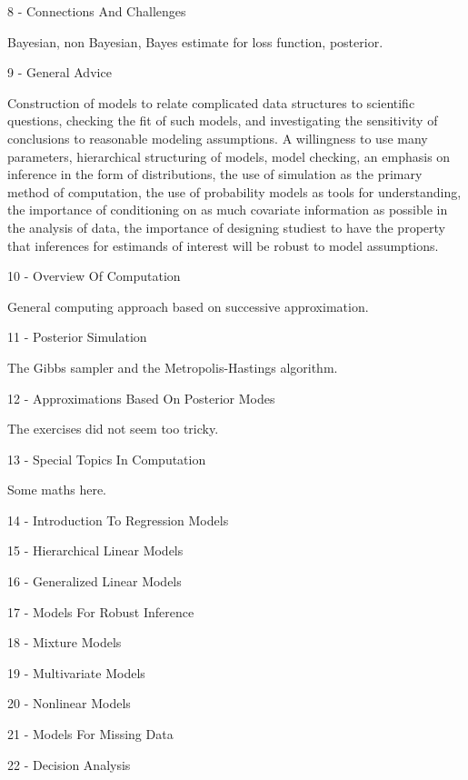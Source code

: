 8 - Connections And Challenges

Bayesian, non Bayesian, Bayes estimate for loss function, posterior.

9 - General Advice

Construction of models to relate complicated data structures to scientific questions, checking the fit of such models, and investigating the sensitivity of conclusions to reasonable modeling assumptions. A willingness to use many parameters, hierarchical structuring of models, model checking, an emphasis on inference in the form of distributions, the use of simulation as the primary method of computation, the use of probability models as tools for understanding, the importance of conditioning on as much covariate information as possible in the analysis of data, the importance of designing studiest to have the property that inferences for estimands of interest will be robust to model assumptions.

10 - Overview Of Computation

General computing approach based on successive approximation.

11 - Posterior Simulation

The Gibbs sampler and the Metropolis-Hastings algorithm.

12 - Approximations Based On Posterior Modes

The exercises did not seem too tricky.

13 - Special Topics In Computation

Some maths here.

14 - Introduction To Regression Models



15 - Hierarchical Linear Models



16 - Generalized Linear Models



17 - Models For Robust Inference



18 - Mixture Models



19 - Multivariate Models



20 - Nonlinear Models



21 - Models For Missing Data



22 - Decision Analysis


